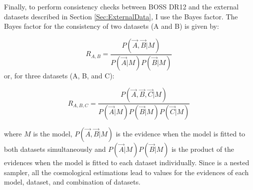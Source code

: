 \qquad Finally, to perform consistency checks between BOSS DR12 and the external datasets described in Section \ref{Sec:ExternalData}, I use the Bayes factor. The Bayes factor for the consistency of two datasets (A and B) is given by:

\begin{equation}
R_{A,B} = \frac{P(\vec{A},\vec{B}|M)}{P(\vec{A}|M)P(\vec{B}|M)}
\label{Eq:BayesFactor}
\end{equation}
\noindent or, for three datasets (A, B, and C):

\begin{equation}
R_{A,B,C} = \frac{P(\vec{A},\vec{B},\vec{C}|M)}{P(\vec{A}|M)P(\vec{B}|M)P(\vec{C}|M)}
\label{Eq:BayesFactor}
\end{equation}

\noindent where $M$ is the model, $P(\vec{A},\vec{B}|M)$ is the evidence when the model is fitted to both datasets simultaneously and $P(\vec{A}|M)P(\vec{B}|M)$ is the product of the evidences when the model is fitted to each dataset individually. Since \pliny is a nested sampler, all the cosmological estimations lead to values for the evidences of each model, dataset, and combination of datasets.


